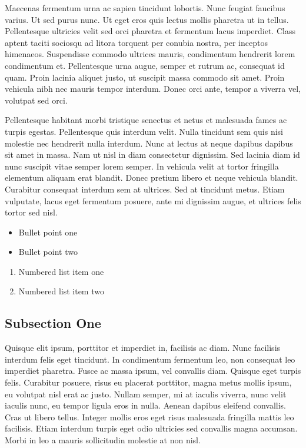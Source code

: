 \documentclass[preprint,12pt]{elsarticle}
\begin{document}
Maecenas \cite{Smith:2012qr} fermentum \cite{Smith:2013jd} urna ac sapien tincidunt lobortis. Nunc feugiat faucibus varius. Ut sed purus nunc. Ut eget eros quis lectus mollis pharetra ut in tellus. Pellentesque ultricies velit sed orci pharetra et fermentum lacus imperdiet. Class aptent taciti sociosqu ad litora torquent per conubia nostra, per inceptos himenaeos. Suspendisse commodo ultrices mauris, condimentum hendrerit lorem condimentum et. Pellentesque urna augue, semper et rutrum ac, consequat id quam. Proin lacinia aliquet justo, ut suscipit massa commodo sit amet. Proin vehicula nibh nec mauris tempor interdum. Donec orci ante, tempor a viverra vel, volutpat sed orci.

Pellentesque habitant morbi tristique senectus et netus et malesuada fames ac turpis egestas. Pellentesque quis interdum velit. Nulla tincidunt sem quis nisi molestie nec hendrerit nulla interdum. Nunc at lectus at neque dapibus dapibus sit amet in massa. Nam ut nisl in diam consectetur dignissim. Sed lacinia diam id nunc suscipit vitae semper lorem semper. In vehicula velit at tortor fringilla elementum aliquam erat blandit. Donec pretium libero et neque vehicula blandit. Curabitur consequat interdum sem at ultrices. Sed at tincidunt metus. Etiam vulputate, lacus eget fermentum posuere, ante mi dignissim augue, et ultrices felis tortor sed nisl.

\begin{itemize}
\item Bullet point one
\item Bullet point two
\end{itemize}

\begin{enumerate}
\item Numbered list item one
\item Numbered list item two
\end{enumerate}

\subsection{Subsection One}

Quisque elit ipsum, porttitor et imperdiet in, facilisis ac diam. Nunc facilisis interdum felis eget tincidunt. In condimentum fermentum leo, non consequat leo imperdiet pharetra. Fusce ac massa ipsum, vel convallis diam. Quisque eget turpis felis. Curabitur posuere, risus eu placerat porttitor, magna metus mollis ipsum, eu volutpat nisl erat ac justo. Nullam semper, mi at iaculis viverra, nunc velit iaculis nunc, eu tempor ligula eros in nulla. Aenean dapibus eleifend convallis. Cras ut libero tellus. Integer mollis eros eget risus malesuada fringilla mattis leo facilisis. Etiam interdum turpis eget odio ultricies sed convallis magna accumsan. Morbi in leo a mauris sollicitudin molestie at non nisl.
\end{document}
